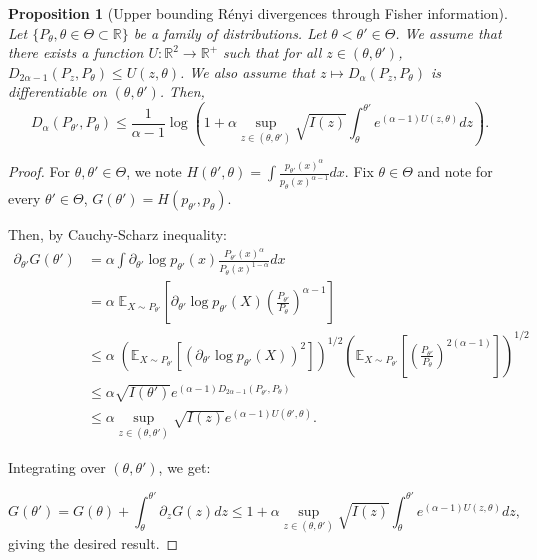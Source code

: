 \documentclass{article}
\theoremstyle{plain}
\newtheorem{proposition}{Proposition}[section]
\theoremstyle{definition}
\theoremstyle{remark}
\begin{document}
\begin{proposition}[Upper bounding Rényi divergences through Fisher information]
\label{prop:app-renyi-criterion}
    Let $\{P_\theta, \theta\in \Theta \subset \mathbb{R}\}$ be a family of distributions. Let $\theta < \theta' \in \Theta$.  We assume that there exists a function $U : \mathbb{R}^2 \to \mathbb{R^+}$ such that for all  $z \in (\theta,\theta')$, $D_{2\alpha-1}(P_{z},P_{\theta}) \leq U(z,\theta)$. We also assume that $z \mapsto D_\alpha(P_z,P_\theta)$ is differentiable on $(\theta,\theta')$.  Then,
    \[D_\alpha(P_{\theta'}, P_\theta) \leq \frac{1}{\alpha-1}\log \left( 1+ \alpha\sup_{z \in (\theta,\theta')} \sqrt{I(z)} \int_{\theta}^{\theta'} e^{(\alpha-1)U(z,\theta)}dz\right).\]
\end{proposition}

\begin{proof}
    For $\theta,\theta' \in \Theta$, we note $H(\theta',\theta) = \int \frac{p_{\theta'}(x)^\alpha}{p_{\theta}(x)^{\alpha-1}} dx$. Fix $\theta \in \Theta$ and note for every $\theta' \in \Theta$, $G(\theta') = H(p_{\theta'}, p_{\theta})$.

    Then, by Cauchy-Scharz inequality: 
    \begin{align*}
        \partial_{\theta'} G(\theta') &= \alpha\int \partial_{\theta'} \log p_{\theta'}(x) \frac{P_{\theta'}(x)^\alpha}{P_\theta(x)^{1-\alpha}}  dx\\
        &= \alpha\; \mathbb{E}_{X \sim P_{\theta'}} \left[\partial_{\theta'} \log p_{\theta'}(X) \left( \frac{P_{\theta'}}{P_\theta}\right)^{\alpha-1}\right]\\
        &\leq \alpha\; (\mathbb{E}_{X \sim P_{\theta'}} \left[(\partial_{\theta'}\log p_{\theta'}(X))^2\right])^{1/2}\left(\mathbb{E}_{X \sim P_{\theta'}} \left[\left( \frac{P_{\theta'}}{P_\theta}\right)^{2(\alpha-1)}\right]\right)^{1/2}\\
        &\leq \alpha \sqrt{I(\theta')}e^{(\alpha-1) D_{2\alpha-1}(P_{\theta '},P_\theta)}\\
        &\leq \alpha\sup_{z\in (\theta,\theta')} \sqrt{I(z)} e^{(\alpha-1) U(\theta',\theta)}.
    \end{align*}

    Integrating over $(\theta,\theta')$, we get:

    \[G(\theta') = G(\theta) + \int_{\theta}^{\theta'} \partial_{z} G(z) dz \leq 1+ \alpha\sup_{z \in (\theta,\theta')} \sqrt{I(z)} \int_{\theta}^{\theta'} e^{(\alpha-1)U(z ,\theta)}dz,\]
    giving the desired result.

\end{proof}
\end{document}
